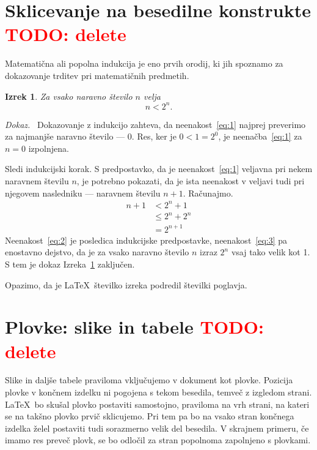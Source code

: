\documentclass[a4paper, 12pt]{book}
\newcommand{\TODO}[1]{\textcolor{red}{TODO: #1}}
\newtheorem{izrek}{Izrek}[chapter]
\newenvironment{dokaz}{\emph{Dokaz.}\ }{\hspace{\fill}{$\Box$}}
\begin{document}
\chapter*{Sklicevanje na besedilne konstrukte \TODO{delete}}


\label{ch1}
Matematična ali popolna indukcija je eno prvih orodij, ki jih spoznamo za dokazovanje trditev pri matematičnih predmetih. 
\begin{izrek}
\label{iz:1}
Za vsako naravno število $n$ velja
\begin{equation}
n < 2^n.
\label{eq:1}
\end{equation}
\end{izrek}
\begin{dokaz}
Dokazovanje z indukcijo zahteva, da neenakost~\eqref{eq:1} najprej preverimo za najmanjše naravno število --- $0$. Res, ker je $0 < 1 = 2^0$, je neenačba~\eqref{eq:1} za $n=0$ izpolnjena.

Sledi indukcijski korak. S predpostavko, da je neenakost~\eqref{eq:1} veljavna pri nekem naravnem številu $n$, je potrebno pokazati, da je ista neenakost v veljavi tudi pri njegovem nasledniku --- naravnem številu $n+1$. Računajmo.
\begin{align}
n+1 &< 2^n + 1  \label{eq:2}\\
    &\le 2^n + 2^n \label{eq:3}\\
    &= 2^{n+1} \nonumber
\end{align} 
Neenakost~\eqref{eq:2} je posledica indukcijske predpostavke, neenakost~\eqref{eq:3} pa enostavno dejstvo, da je za vsako naravno število $n$ izraz $2^n$ vsaj tako velik kot 1. S tem je dokaz Izreka~\ref{iz:1} zaključen.
\end{dokaz}

Opazimo, da je \LaTeX\ številko izreka podredil številki poglavja.



\chapter*{Plovke: slike in tabele \TODO{delete}}
\label{ch2}
Slike in daljše tabele praviloma vključujemo v dokument kot plovke. Pozicija plovke v končnem izdelku ni pogojena s tekom besedila, temveč z izgledom strani. \LaTeX\ bo skušal plovko postaviti samostojno, praviloma na vrh strani, na kateri se na takšno plovko prvič sklicujemo. Pri tem pa bo na vsako stran končnega izdelka želel postaviti tudi sorazmerno velik del besedila. V skrajnem primeru, če imamo res preveč plovk, se bo odločil za stran popolnoma zapolnjeno s plovkami.
\end{document}
